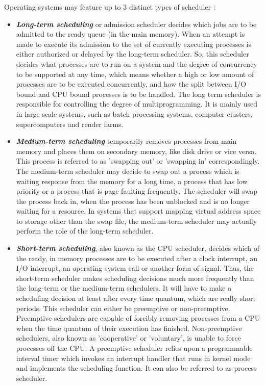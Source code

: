 \documentclass[diploma]{Styles/softlab-thesis}
\begin{document}
Operating systems may feature up to 3 distinct types of scheduler : 
\begin{itemize}
	\item \textbf{\emph{Long-term scheduling}} or admission scheduler decides which jobs are to be admitted to the ready queue (in the main memory). When an attempt is made to execute its admission to the set of currently executing processes is either authorized or delayed by the long-term scheduler. So, this scheduler decides what processes are to run on a system and the degree of concurrency to be supported at any time, which means whether a high or low amount of processes are to be executed concurrently, and how the split between I/O bound and CPU bound processes is to be handled. The long term scheduler is responsible for controlling the degree of multiprogramming. It is mainly used in large-scale systems, such as batch processing systems, computer clusters, supercomputers and render farms.
	\item \textbf{\emph{Medium-term scheduling}} temporarily removes processes from main memory and places them on secondary memory, like disk drive or vice versa. This process is referred to as 'swapping out' or 'swapping in' correspondingly. The medium-term scheduler may decide to swap out a process which is waiting response from the memory for a long time, a process that has low priority or a process that is page faulting frequently. The scheduler will swap the process back in, when the process has been unblocked and is no longer waiting for a resource. In systems that support mapping virtual address space to storage other than the swap file, the medium-term scheduler may actually perform the role of the long-term scheduler.
	\item \textbf{\emph{Short-term scheduling}}, also known as the CPU scheduler, decides which of the ready, in memory processes are to be executed after a clock interrupt, an I/O interrupt, an operating system call or another form of signal. Thus, the short-term scheduler makes scheduling decisions much more frequently than the long-term or the medium-term schedulers. It will have to make a scheduling decision at least after every time quantum, which are really short periods. This scheduler can either be preemptive or non-preemptive. Preemptive schedulers are capable of forcibly removing processes from a CPU when the time quantum of their execution has finished. Non-preemptive schedulers, also known as 'cooperative' or 'voluntary', is unable to force processes off the CPU. A preemptive scheduler relies upon a programmable interval timer which invokes an interrupt handler that runs in kernel mode and implements the scheduling function. It can also be referred to as process scheduler.
\end{itemize}
\end{document}
